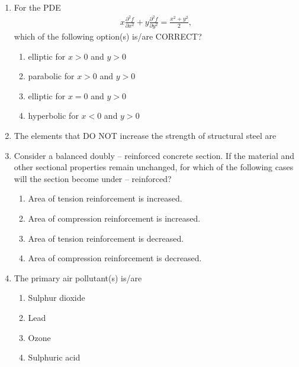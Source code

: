 \documentclass[journal]{IEEEtran}
\begin{document}
\begin{enumerate}
\item For the PDE  
\begin{align}
x \frac{\partial^2 f}{\partial x^2} + y \frac{\partial^2 f}{\partial y^2} = \frac{x^2+y^2}{2},
\end{align}
which of the following option(s) is/are CORRECT?  
\hfill {}  
\begin{enumerate}
\item elliptic for $x > 0$ and $y > 0$  
\item parabolic for $x > 0$ and $y > 0$  
\item elliptic for $x = 0$ and $y > 0$  
\item hyperbolic for $x < 0$ and $y > 0$  
\end{enumerate}

\item The elements that DO NOT increase the strength of structural steel are  
\hfill {}  
\begin{enumerate}
\end{enumerate}

\item Consider a balanced doubly -- reinforced concrete section. If the material and other sectional properties remain unchanged, for which of the following cases will the section become under -- reinforced?  
\hfill {}  
\begin{enumerate}
\item Area of tension reinforcement is increased.  
\item Area of compression reinforcement is increased.  
\item Area of tension reinforcement is decreased.  
\item Area of compression reinforcement is decreased.  
\end{enumerate}



\item The primary air pollutant(s) is/are  
\hfill {}  
\begin{enumerate}
\item Sulphur dioxide
\item Lead
\item Ozone
\item Sulphuric acid
\end{enumerate}


\end{enumerate}
\end{document}
